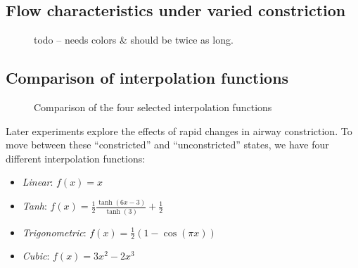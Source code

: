 \subsection{Flow characteristics under varied constriction}

\begin{figure}[ht!]
    \centering
    \begin{tikzpicture}
        
    \end{tikzpicture}
    \caption{ todo -- needs colors \& should be twice as long. }
    \label{fig:constricted-flow-characteristics}
\end{figure}


\subsection{Comparison of interpolation functions}

\begin{figure}[ht!]
    \centering
    \begin{tikzpicture}
        
    \end{tikzpicture}
    \caption{Comparison of the four selected interpolation functions}
    \label{fig:interpolate-functions}
\end{figure}

Later experiments explore the effects of rapid changes in airway constriction. To move between these
``constricted'' and ``unconstricted'' states, we have four different interpolation functions:

\begin{itemize}
    \item \textit{Linear}: $f(x) = x$
    \item \textit{Tanh}: $f(x) = \frac{1}{2} \frac{\tanh(6x - 3)}{\tanh(3)} + \frac{1}{2}$
    \item \textit{Trigonometric}: $f(x) = \frac{1}{2} (1 - \cos(\pi x))$
    \item \textit{Cubic}: $f(x) = 3x^2 - 2x^3$
\end{itemize}

